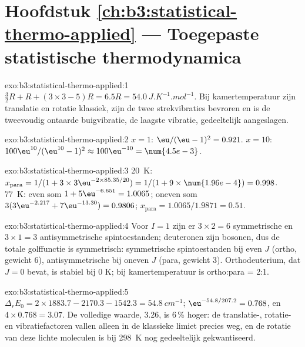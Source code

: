 \section*{Hoofdstuk \ref{ch:b3:statistical-thermo-applied} --- Toegepaste statistische thermodynamica}

\begin{solution}{exo:b3:statistical-thermo-applied:1}
$\frac32R + R + (3 \times 3 - 5)R = 6.5R = \qty{54.0}{J.K^{-1}.mol^{-1}}$. Bij
kamertemperatuur zijn translatie en rotatie klassiek, zijn de twee
strekvibraties bevroren en is de tweevoudig ontaarde buigvibratie, de
laagste vibratie, gedeeltelijk aangeslagen.
\end{solution}

\begin{solution}{exo:b3:statistical-thermo-applied:2}
$x = 1$: $\eu/(\eu - 1)^2 = 0.921$. $x = 10$: $100\eu^{10}/(\eu^{10} - 1)^2 \approx 100\eu^{-10} = \num{4.5e-3}$.
\end{solution}

\begin{solution}{exo:b3:statistical-thermo-applied:3}
\qty{20}{K}: $x_{\mathrm{para}} = 1/(1 + 3 \times 3\eu^{-2 \times 85.35/20}) = 1/(1 + 9 \times \num{1.96e-4}) = 0.998$.
\qty{77}{K}: even som $1 + 5\eu^{-6.651} = 1.0065$; oneven som $3(3\eu^{-2.217} + 7\eu^{-13.30}) = 0.9806$;
$x_{\mathrm{para}} = 1.0065/1.9871 = 0.51$.
\end{solution}

\begin{solution}{exo:b3:statistical-thermo-applied:4}
Voor $I = 1$ zijn er $3 \times 2 = 6$ symmetrische en $3 \times 1 = 3$
antisymmetrische spintoestanden; deuteronen zijn bosonen, dus de totale
golffunctie is symmetrisch: symmetrische spintoestanden bij even $J$
(ortho, gewicht 6), antisymmetrische bij oneven $J$ (para, gewicht
3). Orthodeuterium, dat $J = 0$ bevat, is stabiel bij 0 K; bij
kamertemperatuur is ortho:para = 2:1.
\end{solution}

\begin{solution}{exo:b3:statistical-thermo-applied:5}
$\Delta_rE_0 = 2 \times 1883.7 - 2170.3 - 1542.3 = \qty{54.8}{cm^{-1}}$; $\eu^{-54.8/207.2} = 0.768$, en
$4 \times 0.768 = 3.07$. De volledige waarde, 3.26, is 6\,\% hoger: de
translatie-, rotatie- en vibratiefactoren vallen alleen in de klassieke
limiet precies weg, en de rotatie van deze lichte moleculen is bij
\qty{298}{K} nog gedeeltelijk gekwantiseerd.
\end{solution}

